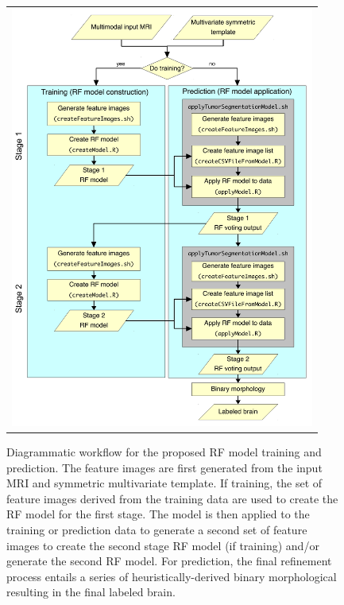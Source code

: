 \documentclass[preprint,authoryear,review,12pt]{elsarticle}
\begin{document}
\begin{figure}[!h]
  \centering
  \begin{tabular}{c}
    \includegraphics[width=100mm]{Figures/pipeline2.pdf}
  \end{tabular}
  \caption{Diagrammatic workflow for the proposed RF model training and prediction.  The feature
  images are first generated from the input MRI and symmetric multivariate template. If training,
  the set of feature images derived from the training data are used to create the RF model
  for the first stage.  The model is then applied to the training or prediction data to generate 
  a second set of feature images to create the second stage RF model (if training) and/or generate
  the second RF model.  
  For prediction, the final refinement process entails a series of heuristically-derived
  binary morphological resulting in the final labeled brain.  
  }
  \label{fig:pipeline}
\end{figure}
\end{document}
